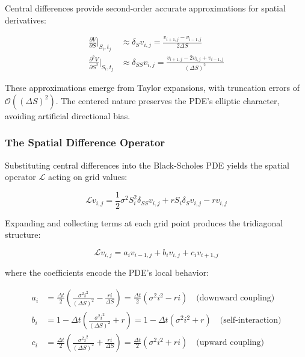 \documentclass[11pt,a4paper]{article}
\begin{document}
Central differences provide second-order accurate approximations for spatial derivatives:

\begin{align}
\frac{\partial V}{\partial S}\bigg|_{S_i,t_j} &\approx \delta_S v_{i,j} = \frac{v_{i+1,j} - v_{i-1,j}}{2\Delta S} \\
\frac{\partial^2 V}{\partial S^2}\bigg|_{S_i,t_j} &\approx \delta_{SS} v_{i,j} = \frac{v_{i+1,j} - 2v_{i,j} + v_{i-1,j}}{(\Delta S)^2}
\end{align}

These approximations emerge from Taylor expansions, with truncation errors of $\mathcal{O}((\Delta S)^2)$. The centered nature preserves the PDE's elliptic character, avoiding artificial directional bias.

\subsubsection{The Spatial Difference Operator}

Substituting central differences into the Black-Scholes PDE yields the spatial operator $\mathcal{L}$ acting on grid values:

\begin{equation}
\mathcal{L}v_{i,j} = \frac{1}{2}\sigma^2 S_i^2 \delta_{SS}v_{i,j} + rS_i\delta_S v_{i,j} - rv_{i,j}
\end{equation}

Expanding and collecting terms at each grid point produces the tridiagonal structure:

\begin{equation}
\mathcal{L}v_{i,j} = a_i v_{i-1,j} + b_i v_{i,j} + c_i v_{i+1,j}
\end{equation}

where the coefficients encode the PDE's local behavior:

\begin{align}
a_i &= \frac{\Delta t}{2}\left(\frac{\sigma^2 i^2}{(\Delta S)^2} - \frac{ri}{\Delta S}\right) = \frac{\Delta t}{2}(\sigma^2 i^2 - ri) \quad \text{(downward coupling)} \\
b_i &= 1 - \Delta t\left(\frac{\sigma^2 i^2}{(\Delta S)^2} + r\right) = 1 - \Delta t(\sigma^2 i^2 + r) \quad \text{(self-interaction)} \\
c_i &= \frac{\Delta t}{2}\left(\frac{\sigma^2 i^2}{(\Delta S)^2} + \frac{ri}{\Delta S}\right) = \frac{\Delta t}{2}(\sigma^2 i^2 + ri) \quad \text{(upward coupling)}
\end{align}
\end{document}
